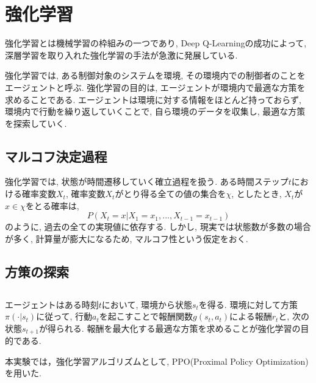 \documentclass[../main]{subfiles}
\begin{document}
\newpage
\chapter{強化学習}
\label{chap:RL}
強化学習とは機械学習の枠組みの一つであり, 
Deep Q-Learning\cite{ref:dqn}の成功によって, 
深層学習を取り入れた強化学習の手法が急激に発展している.

強化学習では, ある制御対象のシステムを環境, 
その環境内での制御者のことをエージェントと呼ぶ.
強化学習の目的は, エージェントが環境内で最適な方策を求めることである.
エージェントは環境に対する情報をほとんど持っておらず, 
環境内で行動を繰り返していくことで, 
自ら環境のデータを収集し, 最適な方策を探索していく.

\section{マルコフ決定過程}
強化学習では, 状態が時間遷移していく確立過程を扱う.
ある時間ステップ$t$における確率変数$X_t$, 
確率変数$X_t$がとり得る全ての値の集合を$\chi$, 
としたとき, $X_t$が$x\in\chi$をとる確率は, 
$$
P(X_t=x|X_1=x_1, ... ,X_{t-1}=x_{t-1})
$$
のように, 過去の全ての実現値に依存する.
しかし, 現実では状態数が多数の場合が多く, 
計算量が膨大になるため, 
マルコフ性という仮定をおく.


\section{方策の探索}
 

\section{}

エージェントはある時刻$t$において, 環境から状態$s_t$を得る.
環境に対して方策$\pi(\cdot|s_t)$に従って, 
行動$a_t$を起こすことで報酬関数$g(s_t,a_t)$による報酬$r_t$と, 
次の状態$s_{t+1}$が得られる. 
報酬を最大化する最適な方策を求めることが強化学習の目的である.


本実験では，強化学習アルゴリズムとして, 
PPO(Proximal Policy Optimization)
\cite{ref:proximal_policy}を用いた.
\end{document}
